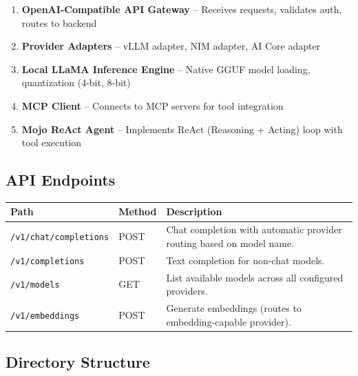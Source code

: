 \documentclass[11pt,a4paper]{article}
\begin{document}
\begin{enumerate}[noitemsep]
    \item \textbf{OpenAI-Compatible API Gateway} -- Receives requests, validates auth, routes to backend
    \item \textbf{Provider Adapters} -- vLLM adapter, NIM adapter, AI Core adapter
    \item \textbf{Local LLaMA Inference Engine} -- Native GGUF model loading, quantization (4-bit, 8-bit)
    \item \textbf{MCP Client} -- Connects to MCP servers for tool integration
    \item \textbf{Mojo ReAct Agent} -- Implements ReAct (Reasoning + Acting) loop with tool execution
\end{enumerate}

\subsection{API Endpoints}

\begin{longtable}{@{}L{4.5cm}L{1.5cm}L{7.5cm}@{}}
\toprule
\textbf{Path} & \textbf{Method} & \textbf{Description} \\
\midrule
\endhead
\texttt{/v1/chat/completions} & POST & Chat completion with automatic provider routing based on model name. \\
\texttt{/v1/completions} & POST & Text completion for non-chat models. \\
\texttt{/v1/models} & GET & List available models across all configured providers. \\
\texttt{/v1/embeddings} & POST & Generate embeddings (routes to embedding-capable provider). \\
\bottomrule
\end{longtable}

\subsection{Directory Structure}
\end{document}
